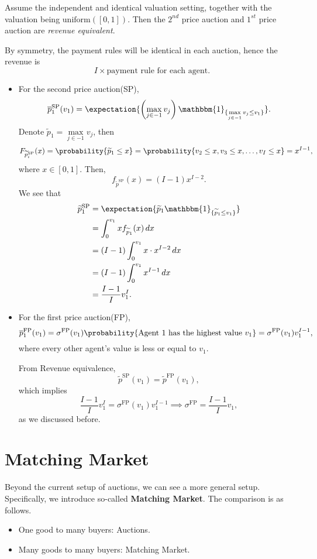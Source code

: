 Assume the independent and identical valuation setting, together with the valuation being \(\mathrm{uniform}([0,1])\). Then the \(2^{nd}\) price auction
and \(1^{st}\) price auction are \emph{revenue equivalent}.

By symmetry, the payment rules will be identical in each auction, hence the revenue is
\[
	I\times \text{payment rule for each agent}.
\]

\begin{itemize}
	\item For the second price auction(SP),
	      \[
		      \overline{p}_1^{\mathrm{SP}}(v_1) = \expectation{\left(\max_{j\in -1}v_{j}\right)\mathbbm{1}_{\{ \max\limits_{j\in -1} v_{j}\leq v_1\}} }.
	      \]
	      Denote \(\widetilde{p}_1 = \max\limits_{j\in -1} v_{j}\), then
	      \[
		      F_{\widetilde{p}^{\mathrm{SP}}_i}(x) = \probability{\widetilde{p}_1\leq x} = \probability{v_2\leq x, v_3\leq x, \ldots , v_I\leq x} = x^{I-1},
	      \]
	      where \(x\in [0, 1]\). Then,
	      \[
		      f_{\widetilde{p}^{\mathrm{SP}}}(x) = (I - 1)x^{I-2}.
	      \]
	      We see that
	      \[
		      \begin{split}
			      \widetilde{p}_1^{\mathrm{SP}} &= \expectation{\widetilde{p}_{1}\mathbbm{1}_{\{ \widetilde{p}_1\leq v_1 \}} }\\
			      &=\int_0^{v_1} xf_{\widetilde{p}_1}(x)\,dx \\
			      &= (I - 1)\int_0^{v_1}x\cdot x^{I-2}\,dx \\
			      &= (I - 1)\int_0^{v_1}x^{I-1}\,dx\\
			      & = \frac{I-1}{I}v_1^I.
		      \end{split}
	      \]
	\item For the first price auction(FP),
	      \[
		      \overline{p}_1^{\mathrm{FP}}(v_1) = \sigma^{\mathrm{FP}}(v_1)\probability{\text{Agent 1 has the highest value \(v_1\)}} = \sigma^{\mathrm{FP}}(v_1)v_1^{I-1},
	      \]
	      where every other agent's value is less or equal to \(v_1\).

	      From Revenue equivalence,
	      \[
		      \widetilde{p}^{\mathrm{SP}}(v_1) = \widetilde{p}^{\mathrm{FP}}(v_1),
	      \]
	      which implies
	      \[
		      \frac{I-1}{I}v_{1}^I = \sigma^{\mathrm{FP}}(v_1)v_1^{I-1} \implies \sigma^{\mathrm{FP}} = \frac{I-1}{I}v_1,
	      \]
	      as we discussed before.
\end{itemize}

\section{Matching Market}
Beyond the current setup of auctions, we can see a more general setup. Specifically, we introduce so-called \textbf{Matching Market}. The comparison is as follows.
\begin{itemize}
	\item One good to many buyers: Auctions.
	\item Many goods to many buyers: Matching Market.
\end{itemize}

